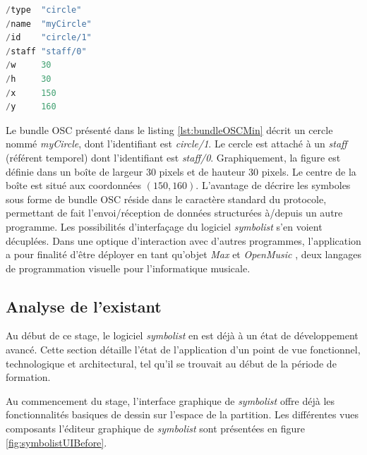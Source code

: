 \begin{lstlisting}[language=java, 
				   caption={Messages OSC \'{e}l\'{e}mentaires pour les symboles d'une partition \textit{symbolist}}, 
				   label={lst:bundleOSCMin}, 
				   captionpos={b}, 
				   numbers=none]
/type  "circle"
/name  "myCircle"
/id    "circle/1"
/staff "staff/0"
/w     30
/h     30
/x     150
/y     160 
\end{lstlisting}

Le bundle OSC présenté dans le listing \ref{lst:bundleOSCMin} décrit un cercle nommé \textit{myCircle}, dont l'identifiant est \textit{circle/1}. Le cercle est attaché à un \textit{staff} (référent temporel) dont l'identifiant est \textit{staff/0}. Graphiquement, la figure est définie dans un boîte de largeur 30 pixels et de hauteur 30 pixels. Le centre de la boîte est situé aux coordonnées $(150, 160)$.
L'avantage de décrire les symboles sous forme de bundle OSC réside dans le caractère standard du protocole, permettant de fait l'envoi/réception de données structurées à/depuis un autre programme. Les possibilités d'interfaçage du logiciel \textit{symbolist} s'en voient décuplées.
Dans une optique d'interaction avec d'autres programmes, l'application a pour finalité d'être déployer en tant qu'objet \textit{Max} \cite{puckette1991} et \textit{OpenMusic} \cite{agon1998}, deux langages de programmation visuelle pour l'informatique musicale.  

\subsection{Analyse de l'existant}
\label{subsec:analyseSymbolist}
        
   Au début de ce stage, le logiciel \textit{symbolist} en est déjà à un état de développement avancé. Cette section détaille l'état de l'application d'un point de vue fonctionnel, technologique et architectural, tel qu'il se trouvait au début de la période de formation.

Au commencement du stage, l'interface graphique de \textit{symbolist} offre déjà les fonctionnalités basiques de dessin sur l'espace de la partition. Les différentes vues composants l'éditeur graphique de \textit{symbolist} sont présentées en figure \ref{fig:symbolistUIBefore}.

